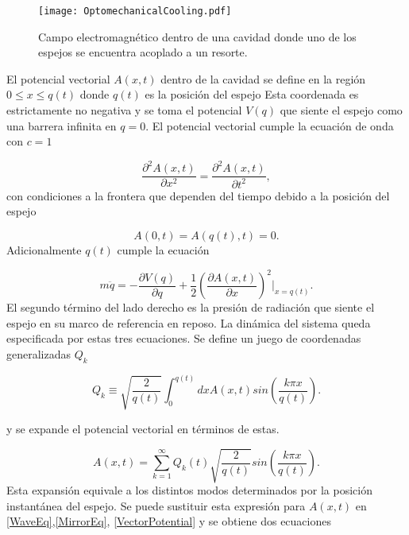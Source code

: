 \documentclass[10pt,a4paper]{report}
\begin{document}
\begin{figure}
\texttt{[image: OptomechanicalCooling.pdf]}
\caption{Campo electromagnético dentro de una cavidad donde uno de los espejos se encuentra acoplado a un resorte. }
\end{figure}

El potencial vectorial $A(x,t)$ dentro de la cavidad se define en la región $0 \leq x \leq q(t)$ donde $q(t)$ es la posición del espejo Esta coordenada es estrictamente no negativa y se toma el potencial $V(q)$ que siente el espejo como una barrera infinita en $q=0$. El potencial vectorial cumple la ecuación de onda con $c=1$

\begin{equation}\label{WaveEq}
\frac{\partial^2 A(x,t)}{\partial x^2} = \frac{\partial^2 A(x,t)}{\partial t^2},
\end{equation} con condiciones a la frontera que dependen del tiempo debido a la posición del espejo

\begin{equation}\label{VectorPotential}
A(0,t) = A(q(t),t) = 0.
\end{equation} Adicionalmente $q(t)$ cumple la ecuación

\begin{equation}\label{MirrorEq}
m\ddot{q} = -\frac{\partial V(q)}{\partial q} + \frac{1}{2}(\frac{\partial A(x,t)}{\partial x})^2 |_{x=q(t)}.
\end{equation} El segundo término del lado derecho es la presión de radiación que siente el espejo en su marco de referencia en reposo. La dinámica del sistema queda especificada por estas tres ecuaciones. Se define un juego de coordenadas generalizadas $Q_k$

\begin{equation} \label{QExpansion}
Q_k \equiv  \sqrt{\frac{2}{q(t)}} \int_0^{q(t)}dx A(x,t)sin(\frac{k\pi x}{q(t)}).
\end{equation}

y se expande el potencial vectorial en términos de estas. 

\begin{equation}
A(x,t) = \sum_{k=1}^\infty Q_k(t) \sqrt{\frac{2}{q(t)}}sin(\frac{k\pi x}{q(t)}).
\end{equation}  Esta expansión equivale a los distintos modos determinados por la posición instantánea del espejo. Se puede sustituir esta expresión para $A(x,t)$ en \eqref{WaveEq},\eqref{MirrorEq}, \eqref{VectorPotential} y se obtiene dos ecuaciones
\end{document}
